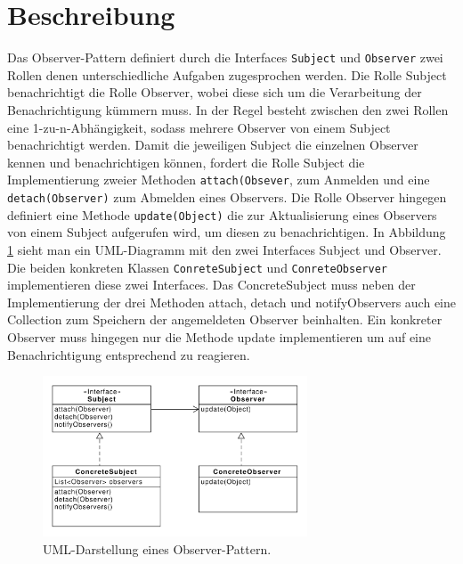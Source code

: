 \section{Beschreibung}

Das Observer-Pattern definiert durch die Interfaces \texttt{Subject} und \texttt{Observer} zwei Rollen denen unterschiedliche Aufgaben zugesprochen werden. Die Rolle Subject benachrichtigt die Rolle Observer, wobei diese sich um die Verarbeitung der Benachrichtigung kümmern muss. In der Regel besteht zwischen den zwei Rollen eine 1-zu-n-Abhängigkeit, sodass mehrere Observer von einem Subject benachrichtigt werden.
Damit die jeweiligen Subject die einzelnen Observer kennen und benachrichtigen können, fordert die Rolle Subject die Implementierung zweier Methoden \texttt{attach(Obsever}, zum Anmelden  und eine \texttt{detach(Observer)} zum Abmelden eines Observers.
Die Rolle Observer hingegen definiert eine Methode \texttt{update(Object)} die zur Aktualisierung eines Observers von einem Subject aufgerufen wird, um diesen zu benachrichtigen.
In Abbildung \ref{observerdiagramm} sieht man ein UML-Diagramm mit den zwei Interfaces Subject und Observer. Die beiden konkreten Klassen \texttt{ConreteSubject} und \texttt{ConreteObserver} implementieren diese zwei Interfaces. Das ConcreteSubject muss neben der Implementierung der drei Methoden attach, detach und notifyObservers auch eine Collection zum Speichern der angemeldeten Observer beinhalten. Ein konkreter Observer muss hingegen nur die Methode update implementieren um auf eine Benachrichtigung entsprechend zu reagieren.


\begin{figure}[htbp]
\centering
\includegraphics[width=0.7\textwidth]{./paper/observer/observer}
\caption{UML-Darstellung eines Observer-Pattern.}
\label{observerdiagramm}
\end{figure} 
